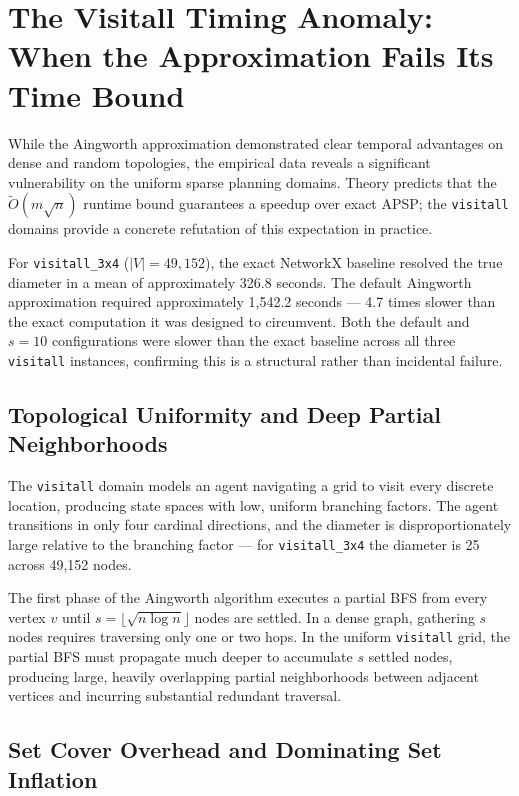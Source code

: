 \section{The Visitall Timing Anomaly: When the Approximation Fails Its Time Bound}
\label{sec:visitall}

While the Aingworth approximation demonstrated clear temporal advantages on dense and random topologies, the empirical data reveals a significant vulnerability on the uniform sparse planning domains. Theory predicts that the $\tilde{O}(m\sqrt{n})$ runtime bound guarantees a speedup over exact APSP; the \texttt{visitall} domains provide a concrete refutation of this expectation in practice.

For \texttt{visitall\_3x4} ($|V| = 49{,}152$), the exact NetworkX baseline resolved the true diameter in a mean of approximately 326.8 seconds. The default Aingworth approximation required approximately 1,542.2 seconds --- 4.7 times slower than the exact computation it was designed to circumvent. Both the default and $s=10$ configurations were slower than the exact baseline across all three \texttt{visitall} instances, confirming this is a structural rather than incidental failure.

\subsection{Topological Uniformity and Deep Partial Neighborhoods}

The \texttt{visitall} domain models an agent navigating a grid to visit every discrete location, producing state spaces with low, uniform branching factors. The agent transitions in only four cardinal directions, and the diameter is disproportionately large relative to the branching factor --- for \texttt{visitall\_3x4} the diameter is 25 across 49,152 nodes.

The first phase of the Aingworth algorithm executes a partial BFS from every vertex $v$ until $s = \lfloor\sqrt{n \log n}\rfloor$ nodes are settled. In a dense graph, gathering $s$ nodes requires traversing only one or two hops. In the uniform \texttt{visitall} grid, the partial BFS must propagate much deeper to accumulate $s$ settled nodes, producing large, heavily overlapping partial neighborhoods between adjacent vertices and incurring substantial redundant traversal.

\subsection{Set Cover Overhead and Dominating Set Inflation}

